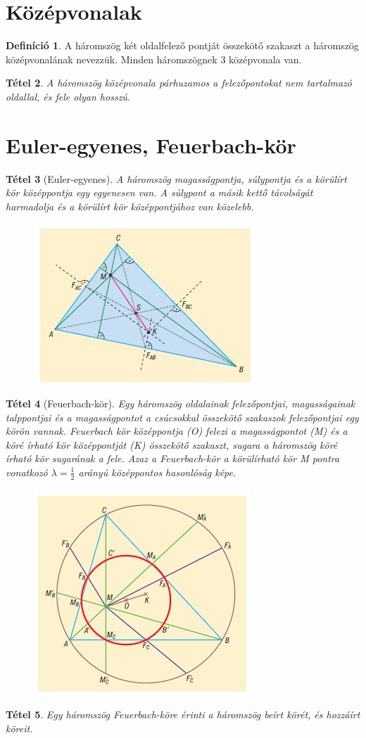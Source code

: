 \documentclass[twoside,12pt]{report}
\newtheorem{theorem}{Tétel}[section]
\theoremstyle{definition}
\newtheorem{definition}[theorem]{Definíció}
\begin{document}
\section{Középvonalak}
	\begin{definition}
		A háromszög két oldalfelező pontját összekötő szakaszt a háromszög középvonalának
		nevezzük. Minden háromszögnek 3 középvonala van.
	\end{definition}
	\begin{theorem}
		A háromszög középvonala párhuzamos a felezőpontokat nem tartalmazó oldallal, és fele
		olyan hosszú.
	\end{theorem}
\pagebreak
\section{Euler-egyenes, Feuerbach-kör}
	\begin{theorem}[Euler-egyenes]
		A háromszög magasságpontja, súlypontja és a körülírt kör középpontja egy egyenesen van. A súlypont a másik kettő távolságát harmadolja és a körülírt kör középpontjához van közelebb.
	\end{theorem}
	\begin{figure}[H]
		\centering
		\includegraphics[width=0.5\linewidth]{Euler}
	\end{figure}
	\begin{theorem}[Feuerbach-kör]
		Egy háromszög oldalainak felezőpontjai, magasságainak talppontjai és a magasságpontot
		a csúcsokkal összekötő szakaszok felezőpontjai egy körön vannak. Feuerbach kör középpontja (O) felezi a magasságpontot (M) és a köré írható kör középpontját (K) összekötő szakaszt, sugara a háromszög köré írható kör sugarának a fele. Azaz a Feuerbach-kör a körülírható kör M pontra vonatkozó $\lambda=\frac{1}{2}$ arányú középpontos hasonlóság képe.
	\end{theorem}
	\begin{figure}[H]
		\centering
		\includegraphics[width=0.5\linewidth]{Feuerbach}
	\end{figure}
	\begin{theorem}
		Egy háromszög Feuerbach-köre érinti a háromszög beírt körét, és hozzáírt köreit.
	\end{theorem}
\end{document}
